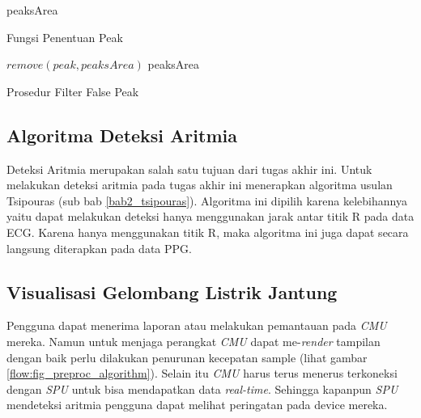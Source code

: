 \begin{algorithm}[H]
 \begin{algorithmic}[1]
   	\State {}
	   			\State {}
				\State {}
				\State {}
				\State {}
				\State {}
				\State {}	
			\EndIf
	   	\Else
	   		\State {}
   		\EndIf
	\EndFor	
	\State \Return peaksArea
	\EndFunction
 \end{algorithmic}
 \caption{Fungsi Penentuan Peak}\label{Algo:peaksFind}
\end{algorithm} 

\begin{algorithm}[H]
 \begin{algorithmic}[1]
	\State {}
   	   	 
	   		\State $remove(peak, peaksArea)$ 
   		\EndIf
	\EndFor	
	\State \Return peaksArea
	\EndFunction
 \end{algorithmic}
 \caption{Prosedur Filter False Peak}\label{Algo:peaksRemove}
\end{algorithm}

\subsection{Algoritma Deteksi Aritmia}
Deteksi Aritmia merupakan salah satu tujuan dari tugas akhir ini. Untuk melakukan deteksi aritmia pada tugas akhir ini menerapkan algoritma usulan Tsipouras (sub bab \ref{bab2_tsipouras}). Algoritma ini dipilih karena kelebihannya yaitu dapat melakukan deteksi hanya menggunakan jarak antar titik R pada data ECG. Karena hanya menggunakan titik R, maka algoritma ini juga dapat secara langsung diterapkan pada data PPG.

\subsection{Visualisasi Gelombang Listrik Jantung}
Pengguna dapat menerima laporan atau melakukan pemantauan pada \textit{CMU} mereka. Namun untuk menjaga perangkat \textit{CMU} dapat me-\textit{render} tampilan dengan baik perlu dilakukan penurunan kecepatan sample (lihat gambar \ref{flow:fig_preproc_algorithm}). Selain itu \textit{CMU} harus terus menerus terkoneksi dengan \textit{SPU} untuk bisa mendapatkan data \textit{real-time}. Sehingga kapanpun \textit{SPU} mendeteksi aritmia pengguna dapat melihat peringatan pada device mereka. 

